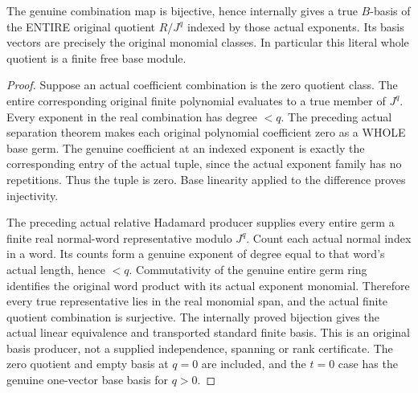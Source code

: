 \begin{theorem}
\label{hir:relative-normal-basis-actual-entire-quotient-basis}
\leanok
The genuine combination map is bijective, hence internally gives a true
$B$-basis of the ENTIRE original quotient $R/J^q$ indexed by those actual
exponents. Its basis vectors are precisely the original monomial classes.
In particular this literal whole quotient is a finite free base module.
\end{theorem}
\begin{proof}
Suppose an actual coefficient combination is the zero quotient class. The
entire corresponding original finite polynomial evaluates to a true member
of $J^q$. Every exponent in the real combination has degree $<q$. The
preceding actual separation theorem makes each original polynomial coefficient
zero as a WHOLE base germ. The genuine coefficient at an indexed exponent
is exactly the corresponding entry of the actual tuple, since the actual
exponent family has no repetitions. Thus the tuple is zero. Base linearity
applied to the difference proves injectivity.

The preceding actual relative Hadamard producer supplies every entire germ a
finite real normal-word representative modulo $J^q$. Count each actual normal
index in a word. Its counts form a genuine exponent of degree equal to that
word's actual length, hence $<q$. Commutativity of the genuine entire germ ring
identifies the original word product with its actual exponent monomial.
Therefore every true representative lies in the real monomial span, and the
actual finite quotient combination is surjective. The internally proved
bijection gives the actual linear equivalence and transported standard finite
basis. This is an original basis producer, not a supplied independence,
spanning or rank certificate. The zero quotient and empty basis at $q=0$ are
included, and the $t=0$ case has the genuine one-vector base basis for $q>0$.
\end{proof}


